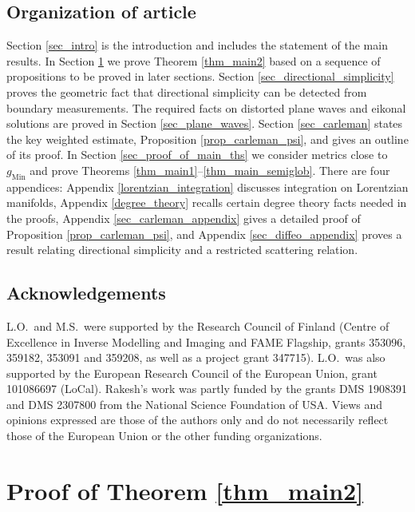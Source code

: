 \documentclass[11pt,letterpaper]{amsart}
\theoremstyle{definition}
\numberwithin{equation}{section}
\newcommand{\gm}{g_{\mathrm{Min}}}
\begin{document}
\subsection{Organization of article}

Section \ref{sec_intro} is the introduction and includes the statement of the main results. In Section \ref{sec_proof_main_theorem} we prove Theorem \ref{thm_main2} based on a sequence of propositions to be proved in later sections. Section \ref{sec_directional_simplicity} proves the geometric fact that directional simplicity can be detected from boundary measurements. The required facts on distorted plane waves and eikonal solutions are proved in Section \ref{sec_plane_waves}. Section \ref{sec_carleman} states the key weighted estimate, Proposition \ref{prop_carleman_psi}, and gives an outline of its proof. In Section \ref{sec_proof_of_main_ths} we consider metrics close to $\gm$ and prove Theorems \ref{thm_main1}--\ref{thm_main_semiglob}. There are four appendices: Appendix \ref{lorentzian_integration} discusses integration on Lorentzian manifolds, Appendix \ref{degree_theory} recalls certain degree theory facts needed in the proofs, Appendix \ref{sec_carleman_appendix} gives a detailed proof of Proposition \ref{prop_carleman_psi}, and Appendix \ref{sec_diffeo_appendix} proves a result relating directional simplicity and a restricted scattering relation.

\subsection*{Acknowledgements}

L.O.\ and M.S.\ were supported by the Research Council of Finland (Centre of Excellence in Inverse Modelling and Imaging and FAME Flagship, grants 353096, 359182, 353091 and 359208, as well as a project grant 347715). L.O.\ was also supported by the European Research Council of the European Union, grant 101086697 (LoCal). Rakesh's work was partly funded by the grants DMS 1908391 and DMS 2307800 from the National Science Foundation of USA. Views and opinions expressed are those of the authors only and do not
necessarily reflect those of the European Union or the other funding
organizations.







\section{Proof of Theorem \ref{thm_main2}} \label{sec_proof_main_theorem}
\end{document}
